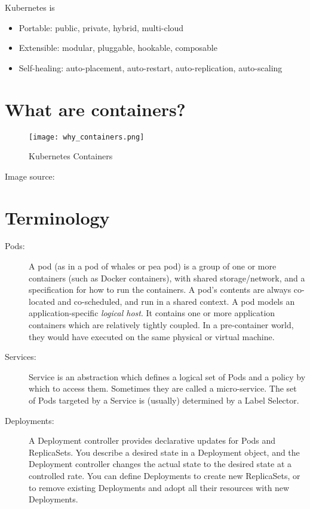 Kubernetes is

\begin{itemize}

\item Portable: public, private, hybrid, multi-cloud
\item Extensible: modular, pluggable, hookable, composable
\item Self-healing: auto-placement, auto-restart, auto-replication,
  auto-scaling
\end{itemize}

\section{What are containers?}

\begin{figure}[htbp]
\centering
\texttt{[image: why\_containers.png]}
\caption{Kubernetes Containers}
\end{figure}

Image source:


\section{Terminology}

\begin{description}

\item[Pods:] A pod (as in a pod of whales or pea pod) is a
  group of one or more containers (such as Docker containers), with
  shared storage/network, and a specification for how to run the
  containers. A pod's contents are always co-located and co-scheduled,
  and run in a shared context. A pod models an application-specific
  \textit{logical host}. It contains one or more application
  containers which are relatively tightly coupled. In a pre-container
  world, they would have executed on the same physical or virtual
  machine.

\item[Services:] Service is an abstraction
  which defines a logical set of Pods and a policy by which to access
  them. Sometimes they are called a micro-service. The set of Pods
  targeted by a Service is (usually) determined by a Label Selector.

\item[Deployments:] A Deployment
  controller provides declarative updates for Pods and
  ReplicaSets. You describe a desired state in a Deployment object,
  and the Deployment controller changes the actual state to the
  desired state at a controlled rate. You can define Deployments to
  create new ReplicaSets, or to remove existing Deployments and adopt
  all their resources with new Deployments.

\end{description}

